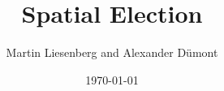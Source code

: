 \documentclass[a4paper,11pt]{article}
\begin{document}
\title{Spatial Election}
\author{Martin Liesenberg and Alexander D\"umont}
\date{\today}
\maketitle

\newpage
\setcounter{tocdepth}{2}
\tableofcontents

\newpage



















\end{document}
